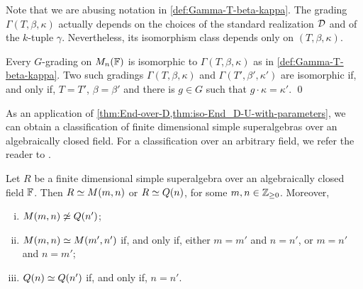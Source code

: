 Note that we are abusing notation in \cref{def:Gamma-T-beta-kappa}. 
The grading $\Gamma (T, \beta, \kappa)$ actually depends on the choices of the standard realization $\mathcal{D}$ and of the $k$-tuple $\gamma$. 
Nevertheless, its isomorphism class depends only on $(T, \beta, \kappa)$. 

\begin{cor}
    Every $G$-grading on $M_n(\mathbb{F})$ is isomorphic to $\Gamma (T, \beta, \kappa)$ as in \cref{def:Gamma-T-beta-kappa}. 
    Two such gradings $\Gamma (T, \beta, \kappa)$ and $\Gamma (T', \beta', \kappa')$ are isomorphic if, and only if, $T = T'$, $\beta = \beta'$ and there is $g\in G$ such that  $g \cdot \kappa = \kappa'$. \qed
\end{cor}

As an application of \cref{thm:End-over-D,thm:iso-End_D-U-with-parameters}, we can obtain a classification of finite dimensional simple superalgebras over an algebraically closed field. 
For a classification over an arbitrary field, we refer the reader to \cite{racine}. 

\begin{thm}\label{thm:fd-simple-SA}
    Let $R$ be a finite dimensional simple superalgebra over an algebraically closed field $\mathbb{F}$. 
    Then $R \simeq M(m,n)$ or $R \simeq Q(n)$, for some $m,n \in \mathbb{Z}_{\geq 0}$. 
    Moreover,
    \begin{enumerate}[(i)]
        \item $M(m,n) \not\simeq Q(n')$;
        \item $M(m,n) \simeq M(m', n')$ if, and only if, either $m=m'$ and $n=n'$, or $m=n'$ and $n=m'$;
        \item $Q(n) \simeq Q(n')$ if, and only if, $n = n'$.
    \end{enumerate}
\end{thm}

